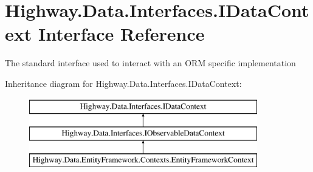 \hypertarget{interface_highway_1_1_data_1_1_interfaces_1_1_i_data_context}{\section{Highway.\-Data.\-Interfaces.\-I\-Data\-Context Interface Reference}
\label{interface_highway_1_1_data_1_1_interfaces_1_1_i_data_context}
}


The standard interface used to interact with an O\-R\-M specific implementation  


Inheritance diagram for Highway.\-Data.\-Interfaces.\-I\-Data\-Context\-:\begin{figure}[H]
\begin{center}
\leavevmode
\includegraphics[height=3.000000cm]{interface_highway_1_1_data_1_1_interfaces_1_1_i_data_context}
\end{center}
\end{figure}
